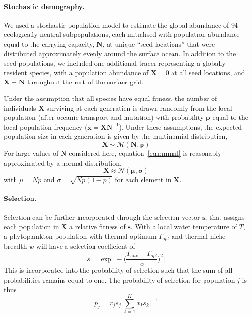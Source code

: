 \documentclass[12pt]{article}
\begin{document}
\paragraph{Stochastic demography.}

We used a stochastic population model to estimate the global abundance of 94 ecologically neutral subpopulations, each initialised with population abundance equal to the carrying capacity, $\mathbf{N}$, at unique ``seed locations'' that were distributed approximately evenly around the surface ocean. In addition to the seed populations, we included one additional tracer representing a globally resident species, with a population abundance of $\mathbf{X} = 0$ at all seed locations, and $\mathbf{X} = \mathbf{N}$ throughout the rest of the surface grid.

Under the assumption that all species have equal fitness, the number of individuals $\mathbf{X}$ surviving at each generation is drawn randomly from the local population (after oceanic transport and mutation) with probability $\mathbf{p}$ equal to the local population frequency ($\mathbf{x} = \mathbf{X} \mathbf{N}^{-1}$). Under these assumptions, the expected population size in each generation is given by the multinomial distribution, 
%
\begin{equation}
\label{eqn:mnml}
\mathbf{X}\sim\mathcal{M}(\mathbf{N},\mathbf{p})
\end{equation}
%
For large values of $\mathbf{N}$ considered here, equation~\ref{eqn:mnml} is reasonably approximated by a normal distribution.
%
\begin{equation}
\mathbf{X}\approx\mathcal{N}(\boldsymbol{\mu},\boldsymbol{\sigma})
\end{equation}
%
with $\mu=Np$ and ${\sigma}=\sqrt{Np(1-p)}$ for each element in $\mathbf{X}$.

\paragraph{Selection.}

Selection can be further incorporated through the selection vector $\mathbf{s}$, that assigns each population in $\mathbf{X}$ a relative fitness of $\mathbf{s}$. With a local water temperature of $T$, a phytoplankton population with thermal optimum $T_{opt}$ and thermal niche breadth $w$ will have a selection coefficient of
%
\begin{equation}
\label{selection_TPC}
s = \exp\bigg[-\Big(\frac{T_{env}-T_{opt}}{w}\Big)^2\bigg]
\end{equation}
%
This is incorporated into the probability of selection such that the sum of all probabilities remains equal to one. The probability of selection for population $j$ is thus
%
\begin{equation}
p_j = x_j s_j \Big[\sum_{k=1}^K x_k s_k\Big]^{-1}
\end{equation}
%
\end{document}
